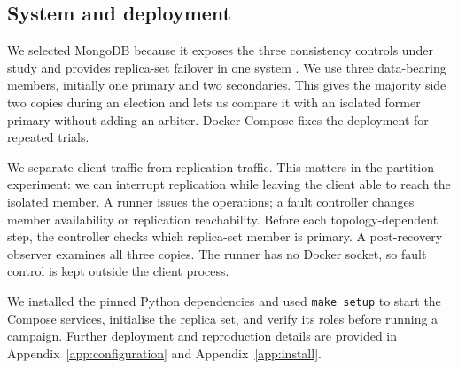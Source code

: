\subsection{System and deployment}

We selected MongoDB because it exposes the three consistency controls under
study and provides replica-set failover in one system
\cite{mongodb-replication,mongodb-causal-consistency}. We use three
data-bearing members, initially one primary and two secondaries. This gives
the majority side two copies during an election and lets us compare it with an
isolated former primary without adding an arbiter. Docker Compose fixes the
deployment for repeated trials.

We separate client traffic from replication traffic. This matters in the
partition experiment: we can interrupt replication while leaving the client
able to reach the isolated member. A runner issues the operations; a fault
controller changes member availability or replication reachability. Before
each topology-dependent step, the controller checks which replica-set member
is primary. A post-recovery observer examines all three copies. The
runner has no Docker socket, so fault control is kept outside the client
process.


We installed the pinned Python dependencies and used \texttt{make setup} to
start the Compose services, initialise the replica set, and verify its roles
before running a campaign. Further deployment and reproduction details are
provided in Appendix~\ref{app:configuration} and
Appendix~\ref{app:install}.
